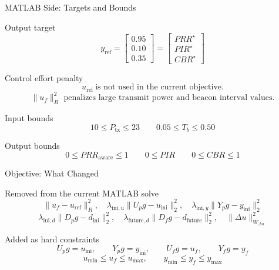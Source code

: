 \documentclass[aspectratio=1610]{beamer}
\begin{document}
\begin{frame}{MATLAB Side: Targets and Bounds}
\begin{block}{Output target}
\[
y_{\mathrm{ref}} =
\begin{bmatrix}
0.95\\
0.10\\
0.35
\end{bmatrix}
=
\begin{bmatrix}
PRR^\star\\
PIR^\star\\
CBR^\star
\end{bmatrix}
\]
\end{block}

\begin{block}{Control effort penalty}
\[
u_{\mathrm{ref}}\ \text{is not used in the current objective.}
\]
\[
\|u_f\|_R^2
\text{ penalizes large transmit power and beacon interval values.}
\]
\end{block}

\begin{alertblock}{Input bounds}
\[
10 \le P_{\mathrm{tx}} \le 23
\qquad
0.05 \le T_b \le 0.50
\]
\end{alertblock}

\begin{alertblock}{Output bounds}
\[
0 \le PRR_{\mathrm{aware}} \le 1
\qquad
0 \le PIR
\qquad
0 \le CBR \le 1
\]
\end{alertblock}
\end{frame}


\begin{frame}{Objective: What Changed}
\begin{block}{Removed from the current MATLAB solve}
\[
\|u_f-u_{\mathrm{ref}}\|_R^2,\quad
\lambda_{\mathrm{ini},u}\|U_p g-u_{\mathrm{ini}}\|_2^2,\quad
\lambda_{\mathrm{ini},y}\|Y_p g-y_{\mathrm{ini}}\|_2^2
\]
\[
\lambda_{\mathrm{ini},d}\|D_p g-d_{\mathrm{ini}}\|_2^2,\quad
\lambda_{\mathrm{future},d}\|D_f g-d_{\mathrm{future}}\|_2^2,\quad
\|\Delta u\|_{W_{\Delta u}}^2
\]
\end{block}

\begin{exampleblock}{Added as hard constraints}
\[
U_p g=u_{\mathrm{ini}},
\qquad
Y_p g=y_{\mathrm{ini}},
\qquad
U_f g=u_f,
\qquad
Y_f g=y_f
\]
\[
u_{\min}\le u_f\le u_{\max},
\qquad
y_{\min}\le y_f\le y_{\max}
\]
\end{exampleblock}
\end{frame}
\end{document}
